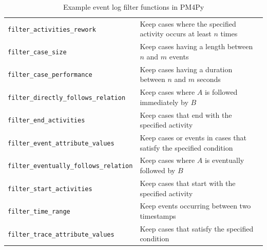 \begin{table}
\small
\renewcommand{\arraystretch}{1.1}
\begin{tabularx}{\textwidth}{l|X} \hline 
\texttt{filter\_activities\_rework} & Keep cases where the specified activity occurs at least $n$ times \\
\texttt{filter\_case\_size} & Keep cases having a length between $n$ and $m$ events \\
\texttt{filter\_case\_performance} & Keep cases having a duration between $n$ and $m$ seconds \\
\texttt{filter\_directly\_follows\_relation} & Keep cases where $A$ is followed immediately by $B$ \\
\texttt{filter\_end\_activities} & Keep cases that end with the specified activity \\
\texttt{filter\_event\_attribute\_values} & Keep cases or events in cases that satisfy the specified condition \\ 
\texttt{filter\_eventually\_follows\_relation} & Keep cases where $A$ is eventually followed by $B$ \\
\texttt{filter\_start\_activities} & Keep cases that start with the specified activity \\
\texttt{filter\_time\_range} & Keep events occurring between two timestamps \\
\texttt{filter\_trace\_attribute\_values} & Keep cases that satisfy the specified condition \\ \hline
\end{tabularx}
\caption{Example event log filter functions in PM4Py}
\label{tab:pm4py_filters}
\end{table}

